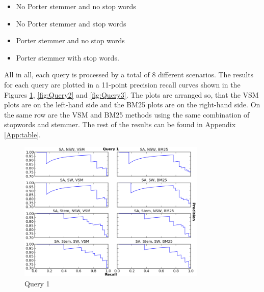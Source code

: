 \begin{itemize}
\item No Porter stemmer and no stop words
\item No Porter stemmer and stop words 
\item Porter stemmer and no stop words
\item Porter stemmer with stop words.
\end{itemize}

All in all, each query is processed by a total of 8 different scenarios. The results for each query are plotted in a 11-point precision recall curves shown in the Figures \ref{fig:Query1}, \ref{fig:Query2} and \ref{fig:Query3}. The plots are arranged so, that the VSM plots are on the left-hand side and the BM25 plots are on the right-hand side. On the same row are the VSM and BM25 methods using the same combination of stopwords and stemmer. The rest of the results can be found in Appendix \ref{App:table}. 



\begin{figure}[ht]
  \centering
  \includegraphics[width=0.8\textwidth]{Query1.png}
  \caption{Query 1 }
  \label{fig:Query1}
\end{figure}
\FloatBarrier

